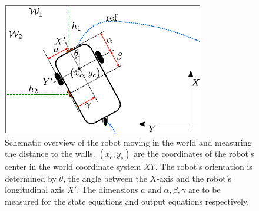 \documentclass[10pt,a4paper]{article}
\begin{document}
\begin{figure}
\centering
\includegraphics[scale=1.8]{figures/illustration_kalman.pdf}
\caption{Schematic overview of the robot moving in the world and measuring the distance to the walls. $(x_{\mathrm{c}},y_{\mathrm{c}})$ are the coordinates of the robot's center in the world coordinate system $XY$. The robot's orientation is determined by $\theta$, the angle between the $X$-axis and the robot's longitudinal axis $X'$. The dimensions $a$ and $\alpha,\beta,\gamma$ are to be measured for the state equations and output equations respectively.}
\label{fig:cartkalman}
\end{figure}
\end{document}

